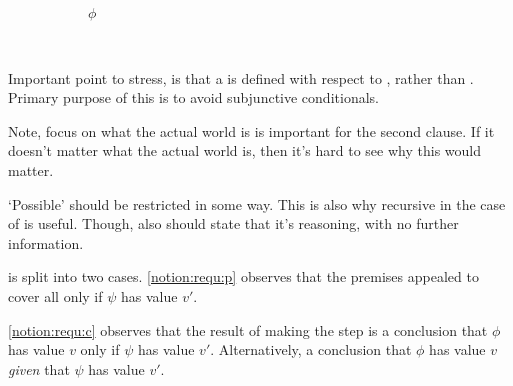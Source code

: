 \begin{figure}[h!]
\begin{subfigure}{0.3\linewidth}
    \caption{\(\phi\)}
  \end{subfigure}
  \hfill\mbox{ }
  \caption{\crequ{}}
  \label{fig:crequ:intuition}
\end{figure}

\begin{note}
  Important point to stress, is that a \requ{} is defined with respect to \epVAd{} , rather than \epPAd{} .
  Primary purpose of this is to avoid subjunctive conditionals.
\end{note}

\begin{note}
    \color{red}
    Note, focus on what the actual world is is important for the second clause.
    If it doesn't matter what the actual world is, then it's hard to see why this would matter.

    `Possible' should be restricted in some way.
    This is also why recursive in the case of \support{} is useful.
    Though, also should state that it's reasoning, with no further information.

  \requ{} is split into two cases.
  \ref{notion:requ:p} observes that the premises appealed to cover all  only if \(\psi\) has value \(v'\).

  \ref{notion:requ:c} observes that the result of making the step is a conclusion that \(\phi\) has value \(v\) only if \(\psi\) has value \(v'\).
  Alternatively, a conclusion that \(\phi\) has value \(v\) \emph{given} that \(\psi\) has value \(v'\).
\end{note}

